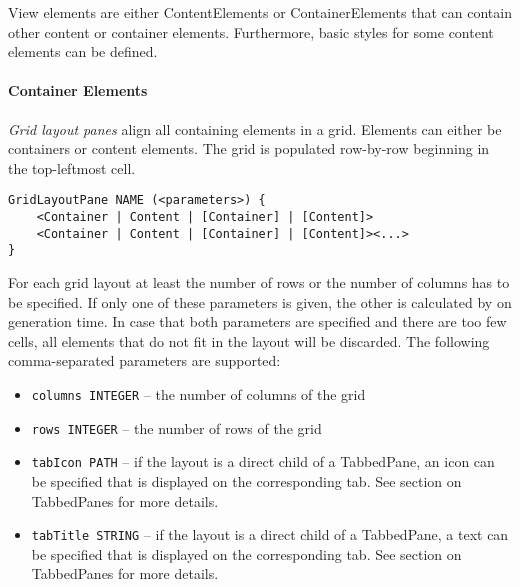 
View elements are either ContentElements or ContainerElements that can contain other content or container elements. Furthermore, basic styles for some content elements can be defined.

\paragraph{Container Elements}

\textit{Grid layout panes} align all containing elements in a grid. Elements can either be containers or content elements. The grid is populated row-by-row beginning in the top-leftmost cell.

\begin{lstlisting}
GridLayoutPane NAME (<parameters>) {
	<Container | Content | [Container] | [Content]>
	<Container | Content | [Container] | [Content]><...>
}
\end{lstlisting}

For each grid layout at least the number of rows or the number of columns has to be specified. If only one of these parameters is given, the other is calculated by \MD on generation time. In case that both parameters are specified and there are too few cells, all elements that do not fit in the layout will be discarded. The following comma-separated parameters are supported:
\begin{itemize}
\item \lstinline!columns INTEGER! -- the number of columns of the grid
\item \lstinline!rows INTEGER! -- the number of rows of the grid
\item \lstinline!tabIcon PATH! -- if the layout is a direct child of a TabbedPane, an icon can be specified that is displayed on the corresponding tab. See section on TabbedPanes for more details.
\item \lstinline!tabTitle STRING! -- if the layout is a direct child of a TabbedPane, a text can be specified that is displayed on the corresponding tab. See section on TabbedPanes for more details.
\end{itemize}

